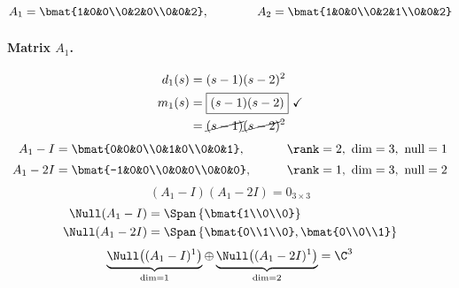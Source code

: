 \begin{example}
\[
A_1=\bmat{1&0&0\\0&2&0\\0&0&2},\qquad\qquad A_2=\bmat{1&0&0\\0&2&1\\0&0&2}
\]
\paragraph{Matrix $A_1$.}
\begin{align*}
d_1(s)&=(s-1)(s-2)^2\\
m_1(s)&=\boxed{(s-1)(s-2)}\ \checkmark\\
&=\cancel{(s-1)}\cancel{(s-2)}^2
\end{align*}
\begin{alignat*}{2}
A_1-I&=\bmat{0&0&0\\0&1&0\\0&0&1}, &\qquad&\rank=2,\ \dim=3,\ \text{null}=1\\[2pt]
A_1-2I&=\bmat{-1&0&0\\0&0&0\\0&0&0}, &&\rank=1,\ \dim=3,\ \text{null}=2
\end{alignat*}
\[ (A_1-I)(A_1-2I)=0_{3\times3} \]
\begin{align*}
\Null(A_1-I)&=\Span\left\{\bmat{1\\0\\0}\right\}\\
\Null(A_1-2I)&=\Span\left\{\bmat{0\\1\\0},\bmat{0\\0\\1}\right\}
\end{align*}
\[
\underbrace{\Null\big((A_1-I)^1\big)}_{\dim=1}\oplus\underbrace{\Null\big((A_1-2I)^1\big)}_{\dim=2}=\C^3
\]


\end{example}
